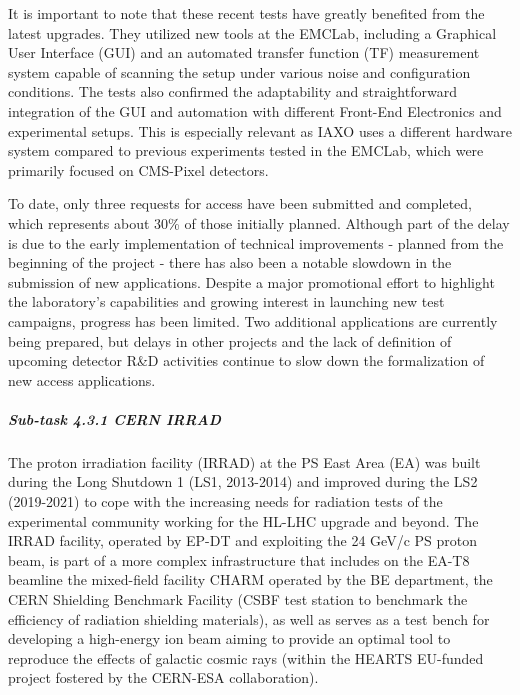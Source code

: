 It is important to note that these recent tests have greatly benefited from the latest upgrades. They utilized new tools at the EMCLab, including a Graphical User Interface (GUI) and an automated transfer function (TF) measurement system capable of scanning the setup under various noise and configuration conditions. The tests also confirmed the adaptability and straightforward integration of the GUI and automation with different Front-End Electronics and experimental setups. This is especially relevant as IAXO uses a different hardware system compared to previous experiments tested in the EMCLab, which were primarily focused on CMS-Pixel detectors. 

To date, only three requests for access have been submitted and completed, which represents about 30\% of those initially planned. Although part of the delay is due to the early implementation of technical improvements - planned from the beginning of the project - there has also been a notable slowdown in the submission of new applications. Despite a major promotional effort to highlight the laboratory's capabilities and growing interest in launching new test campaigns, progress has been limited. Two additional applications are currently being prepared, but delays in other projects and the lack of definition of upcoming detector R\&D activities continue to slow down the formalization of new access applications.

\subparagraph{Sub-task 4.3.1 CERN IRRAD} \mbox{}

The proton irradiation facility (IRRAD) at the PS East Area (EA) was built during the Long Shutdown 1 (LS1, 2013-2014) and improved during the LS2 (2019-2021) to cope with the increasing needs for radiation tests of the experimental community working for the HL-LHC upgrade and beyond. The IRRAD facility, operated by EP-DT and exploiting the 24 GeV/c PS proton beam, is part of a more complex infrastructure that includes on the EA-T8 beamline the mixed-field facility CHARM operated by the BE department, the CERN Shielding Benchmark Facility (CSBF test station to benchmark the efficiency of radiation shielding materials), as well as serves as a test bench for developing a high-energy ion beam aiming to provide an optimal tool to reproduce the effects of galactic cosmic rays (within the HEARTS EU-funded project fostered by the CERN-ESA collaboration).

